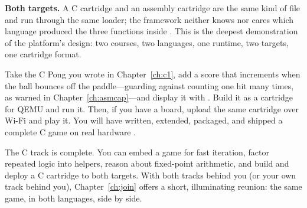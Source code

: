 \begin{prgtargets}
\textbf{Both targets.} A C cartridge and an assembly cartridge are the same kind of
file and run through the same loader; the framework neither knows nor cares which
language produced the three functions inside \citep{prg32teaching}. This is the
deepest demonstration of the platform's design: two courses, two languages, one
runtime, two targets, one cartridge format.
\end{prgtargets}

\begin{prgtry}
Take the C Pong you wrote in Chapter~\ref{ch:c1}, add a score that increments when
the ball bounces off the paddle---guarding against counting one hit many times, as
warned in Chapter~\ref{ch:asmcap}---and display it with .
Build it as a cartridge for QEMU and run it. Then, if you have a board, upload the
same cartridge over Wi-Fi and play it. You will have written, extended, packaged,
and shipped a complete C game on real \riscv hardware \citep{prg32repo}.
\end{prgtry}

\begin{prgcheck}
The C track is complete. You can embed a game for fast iteration, factor repeated
logic into helpers, reason about fixed-point arithmetic, and build and deploy a C
cartridge to both targets. With both tracks behind you (or your own track behind
you), Chapter~\ref{ch:join} offers a short, illuminating reunion: the same game,
in both languages, side by side.
\end{prgcheck}
